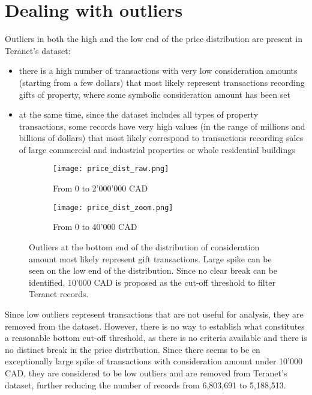 \section{Dealing with outliers} \label{sec:outliers}

Outliers in both the high and the low end of the price distribution are present in Teranet's dataset:
\begin{itemize}
    \item there is a high number of transactions with very low consideration amounts (starting from a few dollars) that most likely represent transactions recording gifts of property, where some symbolic consideration amount has been set
    \item at the same time, since the dataset includes all types of property transactions, some records have very high values (in the range of millions and billions of dollars) that most likely correspond to transactions recording sales of large commercial and industrial properties or whole residential buildings
\end{itemize}

\begin{figure}[ht]
    \centering
    \begin{subfigure}{\linewidth}
        \centering
        \texttt{[image: price\_dist\_raw.png]}
        \caption{From 0 to 2'000'000 CAD}
    \end{subfigure}

    \begin{subfigure}{\linewidth}
        \centering
        \texttt{[image: price\_dist\_zoom.png]}
        \caption{From 0 to 40'000 CAD}
    \end{subfigure}
    \caption{Outliers at the bottom end of the distribution of consideration amount most likely represent gift transactions.
    Large spike can be seen on the low end of the distribution.
    Since no clear break can be identified, 10'000 CAD is proposed as the cut-off threshold to filter Teranet records.}
    \label{fig:bottom_outliers}
\end{figure}

Since low outliers represent transactions that are not useful for analysis, they are removed from the dataset.
However, there is no way to establish what constitutes a reasonable bottom cut-off threshold, as there is no criteria available and there is no distinct break in the price distribution.
Since there seems to be en exceptionally large spike of transactions with consideration amount under 10'000 CAD, they are considered to be low outliers and are removed from Teranet's dataset, further reducing the number of records from 6,803,691 to 5,188,513.

